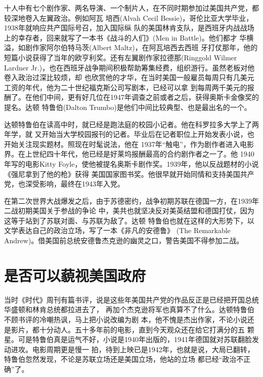\documentclass[10pt]{article}
\begin{document}
{十人中有七个剧作家、两名导演、一个制片人，在不同时期参加过美国共产党，都较深地卷入左翼政治。例如阿瓦
\textperiodcentered 培西(Alvah Cecil Bessie)，哥伦比亚大学毕业，1938年就响应共产国际号召，加入国际纵
队的美国林肯支队，是西班牙内战战场上的幸存者，回来就写了一本书《战斗的人们》(Men in Battle)。他们都才
华横溢，如剧作家阿尔伯特\textperiodcentered 马茨(Albert Maltz)，在阿瓦\textperiodcentered 培西去西班
牙打仗那年，他的短篇小说获得了当年的欧\textperiodcentered 亨利奖。还有左翼剧作家拉德那(Ringgold
Wilmer Lardner Jr.)，也在西班牙战争期间积极帮助筹集经费，组织游行。虽然老板对他卷入政治过深比较烦，却
也欣赏他的才华，在当时美国一般雇员每周只有几美元工资的年代，他为二十世纪福克斯公司写剧本，已经可以拿
到每周两千美元的报酬了。在他们中间，更有好几位在1947年调查之前或者之后，获得奥斯卡金像奖的提名。达顿
\textperiodcentered 特鲁伯(Dalton Trumbo)是他们中间比较典型、也是最出名的一个。

达顿\textperiodcentered 特鲁伯在读高中时，就已经是跑法庭的校园小记者。他在科罗拉多大学上了两年学，就
又开始当大学校园报刊的记者。毕业后在记者职位上开始发表小说，也开始关注现实题材。照现在时髦说法，他在
1937年``触电''，作为剧作者进入电影界。在上世纪四十年代，他已经是好莱坞报酬最高的合约剧作者之一了。他
1940年写的电影Kitty Foyle，使他被提名奥斯卡剧作奖。1939年，他以反战题材的小说《强尼拿到了他的枪》获得
美国国家图书奖。他很早就开始同情和支持美国共产党，也深受影响，最终在1943年入党。

在第二次世界大战爆发之后，由于苏德密约，战争初期苏联在德国一方，在1939年二战初期美国关于参战的争论
中，美共也就坚决反对美英结盟和德国打仗，因为这等于站到了苏联对面、与苏联为敌了。达顿
\textperiodcentered 特鲁伯也就在这样的大形势下，以文学表达自己的政治立场，写了一本《非凡的安德鲁》
(The Remarkable Andrew)。借美国前总统安德鲁\textperiodcentered 杰克逊的幽灵之口，警告美国不得参加二战。

\pagebreak
\section{是否可以藐视美国政府}

当时《时代》周刊有篇书评，说是这些年美国共产党的作品反正是已经把开国总统华盛顿和林肯总统都拉进去了，
再加个杰克逊将军也真算不了什么。达顿\textperiodcentered 特鲁伯不顾书评的冷嘲热讽，马上把小说改编为剧
本，他不愧是杰出作家，不论小说还是影片，都十分动人。五十多年前的电影，直到今天观众还在给它打满分的五
颗星。可是特鲁伯真是运气不好，小说是1940年出版的，1941年德国就对苏联翻脸发动进攻。电影周期更是慢一
拍，待到上映已是1942年，也就是说，大局已翻转，特鲁伯忽然发现，不论是苏联立场还是美国立场，他站的立场
都已经``政治不正确''了。

}
\end{document}

